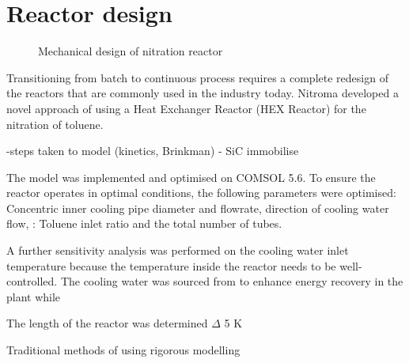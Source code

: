 \section*{Reactor design}
\begin{figure}[h]
    \centering
    \caption{Mechanical design of nitration reactor}
    \label{fig:comsol-S4-CW-X-T}
\end{figure}

Transitioning from batch to continuous process requires a complete redesign of the reactors that are commonly used in the industry today. Nitroma developed a novel approach of using a Heat Exchanger Reactor (HEX Reactor) for the nitration of toluene.

-steps taken to model (kinetics, Brinkman) 
- SiC immobilise

The model was implemented and optimised on COMSOL 5.6. To ensure the reactor operates in optimal conditions, the following parameters were optimised: Concentric inner cooling pipe diameter and flowrate, direction of cooling water flow,  : Toluene inlet ratio and the total number of tubes.

A further sensitivity analysis was performed on the cooling water inlet temperature because the temperature inside the reactor needs to be well-controlled. The cooling water was sourced from to enhance energy recovery in the plant while 

The length of the reactor was determined \mypm $\Delta$ 5 K

Traditional methods of using 
rigorous modelling

